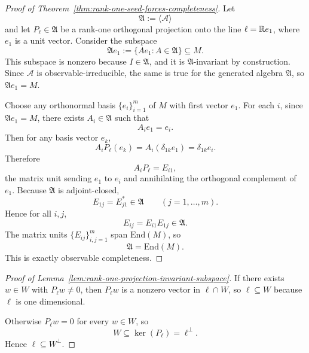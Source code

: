 \begin{proof}[Proof of Theorem~\ref{thm:rank-one-seed-forces-completeness}]
\label{proof:thm:rank-one-seed-forces-completeness}
Let
\[
\mathfrak A:=\langle\mathcal A\rangle
\]
and let $P_{\ell}\in\mathfrak A$ be a rank-one orthogonal projection onto the
line $\ell=\mathbb{R} e_1$, where $e_1$ is a unit vector. Consider the subspace
\[
\mathfrak A e_1:=\{Ae_1 : A\in\mathfrak A\}\subseteq M.
\]
This subspace is nonzero because $I\in\mathfrak A$, and it is
$\mathfrak A$-invariant by construction. Since $\mathcal A$ is
observable-irreducible, the same is true for the generated algebra
$\mathfrak A$, so $\mathfrak A e_1=M$.

Choose any orthonormal basis $\{e_i\}_{i=1}^m$ of $M$ with first vector $e_1$.
For each $i$, since $\mathfrak A e_1=M$, there exists $A_i\in\mathfrak A$ such
that
\[
A_i e_1=e_i.
\]
Then for any basis vector $e_k$,
\[
A_i P_{\ell}(e_k)=A_i(\delta_{1k}e_1)=\delta_{1k}e_i.
\]
Therefore
\[
A_i P_{\ell}=E_{i1},
\]
the matrix unit sending $e_1$ to $e_i$ and annihilating the orthogonal
complement of $e_1$. Because $\mathfrak A$ is adjoint-closed,
\[
E_{1j}=E_{j1}^*\in\mathfrak A
\qquad(j=1,\dots,m).
\]
Hence for all $i,j$,
\[
E_{ij}=E_{i1}E_{1j}\in\mathfrak A.
\]
The matrix units $\{E_{ij}\}_{i,j=1}^m$ span $\mathrm{End}(M)$, so
\[
\mathfrak A=\mathrm{End}(M).
\]
This is exactly observable completeness.
\end{proof}

\begin{proof}[Proof of Lemma~\ref{lem:rank-one-projection-invariant-subspace}]
\label{proof:lem:rank-one-projection-invariant-subspace}
If there exists $w\in W$ with $P_{\ell}w\neq 0$, then $P_{\ell}w$ is a nonzero
vector in $\ell\cap W$, so $\ell\subseteq W$ because $\ell$ is one
dimensional.

Otherwise $P_{\ell}w=0$ for every $w\in W$, so
\[
W\subseteq \ker(P_{\ell})=\ell^{\perp}.
\]
Hence $\ell\subseteq W^{\perp}$.
\end{proof}


